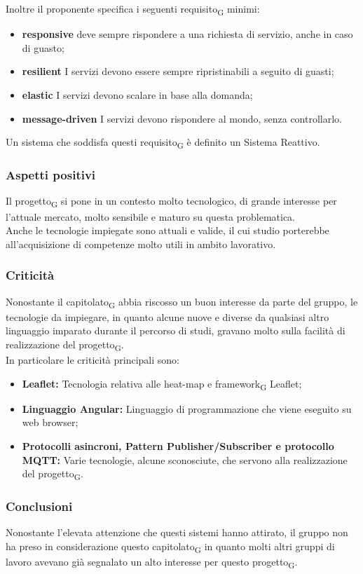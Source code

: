 Inoltre il proponente specifica i seguenti requisito\textsubscript{G} minimi:
\begin{itemize}
	\item \textbf{responsive} deve sempre rispondere a una richiesta di servizio, anche in caso di guasto;
	\item \textbf{resilient} I servizi devono essere sempre ripristinabili a seguito di guasti;
	\item \textbf{elastic} I servizi devono scalare in base alla domanda;
	\item \textbf{message-driven} I servizi devono rispondere al mondo, senza controllarlo.
\end{itemize}
Un sistema che soddisfa questi requisito\textsubscript{G} è definito un Sistema Reattivo.


\subsubsection{Aspetti positivi}

Il progetto\textsubscript{G} si pone in un contesto molto tecnologico, di grande interesse per l'attuale mercato, molto sensibile e maturo su questa problematica.\\
Anche le tecnologie impiegate sono attuali e valide, il cui studio porterebbe all'acquisizione di competenze molto utili in ambito lavorativo.



\subsubsection{Criticità}

Nonostante il capitolato\textsubscript{G} abbia riscosso un buon interesse da parte del gruppo, le tecnologie da impiegare, in quanto alcune nuove e diverse da qualsiasi altro linguaggio imparato durante il percorso di studi, gravano molto sulla facilità di realizzazione del progetto\textsubscript{G}.\\
In particolare le criticità principali sono:
\begin{itemize}
    \item \textbf{Leaflet:} Tecnologia relativa alle heat-map e framework\textsubscript{G} Leaflet;
    \item \textbf{Linguaggio Angular:} Linguaggio di programmazione che viene eseguito su web browser;
    \item \textbf{Protocolli asincroni, Pattern Publisher/Subscriber e protocollo MQTT: } Varie tecnologie, alcune sconosciute, che servono alla realizzazione del progetto\textsubscript{G}.
\end{itemize}


\subsubsection{Conclusioni}

Nonostante l'elevata attenzione che questi sistemi hanno attirato, il gruppo non ha preso in considerazione questo capitolato\textsubscript{G} in quanto molti altri gruppi di lavoro avevano già segnalato un alto interesse per questo progetto\textsubscript{G}. \\
